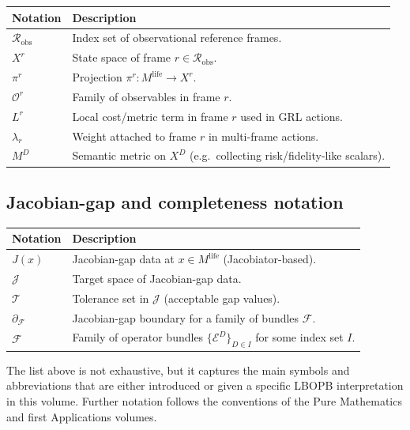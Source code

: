 \documentclass[11pt]{book}
\theoremstyle{plain}
\theoremstyle{definition}
\theoremstyle{remark}
\begin{document}
\begin{center}
\begin{tabular}{ll}
\hline
Notation & Description \\
\hline
$\mathcal{R}_{\mathrm{obs}}$ & Index set of observational reference frames. \\
$X^{r}$ & State space of frame $r \in \mathcal{R}_{\mathrm{obs}}$. \\
$\pi^{r}$ & Projection $\pi^{r} \colon M^{\mathrm{life}} \to X^{r}$. \\
$\mathcal{O}^{r}$ & Family of observables in frame $r$. \\
$L^{r}$ & Local cost/metric term in frame $r$ used in GRL actions. \\
$\lambda_{r}$ & Weight attached to frame $r$ in multi-frame actions. \\
$M^{D}$ & Semantic metric on $X^{D}$ (e.g.\ collecting risk/fidelity-like scalars). \\
\hline
\end{tabular}
\end{center}

\subsection*{Jacobian-gap and completeness notation}

\begin{center}
\begin{tabular}{ll}
\hline
Notation & Description \\
\hline
$J(x)$ & Jacobian-gap data at $x \in M^{\mathrm{life}}$ (Jacobiator-based). \\
$\mathcal{J}$ & Target space of Jacobian-gap data. \\
$\mathcal{T}$ & Tolerance set in $\mathcal{J}$ (acceptable gap values). \\
$\partial_{\mathcal{F}}$ & Jacobian-gap boundary for a family of bundles $\mathcal{F}$. \\
$\mathcal{F}$ & Family of operator bundles $\{\mathcal{E}^{D}\}_{D \in I}$ for some index set $I$. \\
\hline
\end{tabular}
\end{center}

The list above is not exhaustive, but it captures the main symbols and
abbreviations that are either introduced or given a specific LBOPB
interpretation in this volume. Further notation follows the conventions
of the Pure Mathematics and first Applications volumes.
\end{document}
